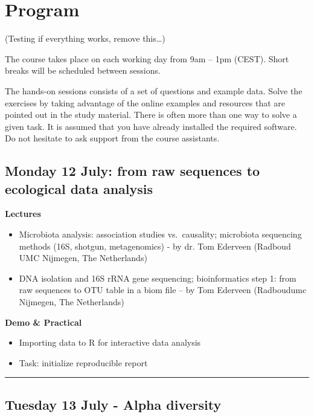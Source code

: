 \documentclass[
  oneside]{book}
\begin{document}
\hypertarget{program}{%
\chapter{Program}\label{program}}

(Testing if everything works, remove this\ldots)

The course takes place on each working day from 9am -- 1pm
(CEST). Short breaks will be scheduled between sessions.

The hands-on sessions consists of a set of questions and example
data. Solve the exercises by taking advantage of the online examples
and resources that are pointed out in the study material. There is
often more than one way to solve a given task. It is assumed that you
have already installed the required software. Do not hesitate to ask
support from the course assistants.

\hypertarget{monday-12-july-from-raw-sequences-to-ecological-data-analysis}{%
\section{Monday 12 July: from raw sequences to ecological data analysis}\label{monday-12-july-from-raw-sequences-to-ecological-data-analysis}}

\textbf{Lectures}

\begin{itemize}
\item
  Microbiota analysis: association studies vs.~causality; microbiota sequencing methods (16S, shotgun, metagenomics) - by dr. Tom Ederveen (Radboud UMC Nijmegen, The Netherlands)
\item
  DNA isolation and 16S rRNA gene sequencing; bioinformatics step 1: from raw sequences to OTU table in a biom file -- by Tom Ederveen (Radboudumc Nijmegen, The Netherlands)
\end{itemize}

\textbf{Demo \& Practical}

\begin{itemize}
\item
  Importing data to R for interactive data analysis
\item
  Task: initialize reproducible report
\end{itemize}

\begin{center}\rule{0.5\linewidth}{0.5pt}\end{center}

\hypertarget{tuesday-13-july---alpha-diversity}{%
\section{Tuesday 13 July - Alpha diversity}\label{tuesday-13-july---alpha-diversity}}
\end{document}
